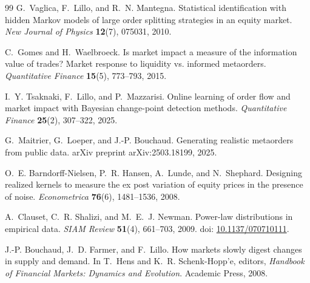 \documentclass[11pt]{article}
\begin{document}
\begin{thebibliography}{99}
G.~Vaglica, F.~Lillo, and R.~N. Mantegna.
\newblock Statistical identification with hidden {Markov} models of large order splitting strategies in an equity market.
\newblock \emph{New Journal of Physics} \textbf{12}(7), 075031, 2010.

C.~Gomes and H.~Waelbroeck.
\newblock Is market impact a measure of the information value of trades? Market response to liquidity vs. informed metaorders.
\newblock \emph{Quantitative Finance} \textbf{15}(5), 773--793, 2015.

I.~Y. Tsaknaki, F.~Lillo, and P.~Mazzarisi.
\newblock Online learning of order flow and market impact with Bayesian change-point detection methods.
\newblock \emph{Quantitative Finance} \textbf{25}(2), 307--322, 2025.

G.~Maitrier, G.~Loeper, and J.-P. Bouchaud.
\newblock Generating realistic metaorders from public data.
\newblock arXiv preprint arXiv:2503.18199, 2025.

O.~E. Barndorff-Nielsen, P.~R. Hansen, A.~Lunde, and N.~Shephard.
\newblock Designing realized kernels to measure the ex post variation of equity prices in the presence of noise.
\newblock \emph{Econometrica} \textbf{76}(6), 1481--1536, 2008.

A.~Clauset, C.~R. Shalizi, and M.~E.~J. Newman.
\newblock Power-law distributions in empirical data.
\newblock \emph{SIAM Review} \textbf{51}(4), 661--703, 2009.
\newblock doi: \href{https://doi.org/10.1137/070710111}{10.1137/070710111}.

J.-P. Bouchaud, J.~D. Farmer, and F.~Lillo.
\newblock How markets slowly digest changes in supply and demand.
\newblock In T.~Hens and K.~R. Schenk-Hopp{'e}, editors, \emph{Handbook of Financial Markets: Dynamics and Evolution}.
\newblock Academic Press, 2008.








\end{thebibliography}
\end{document}
